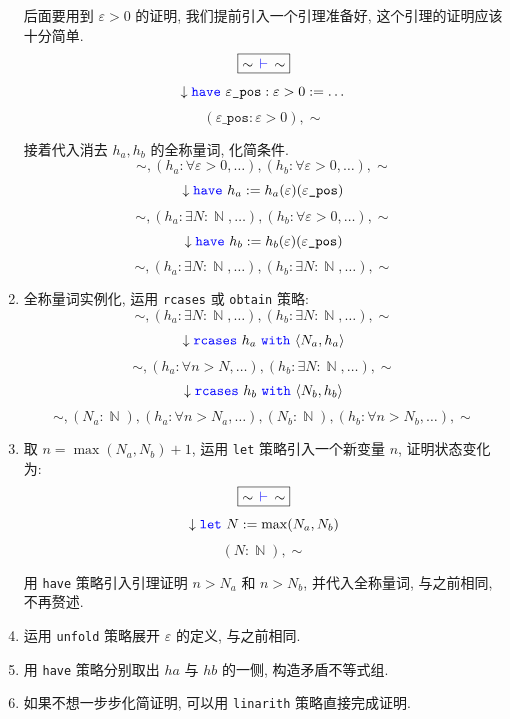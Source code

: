 \documentclass[UTF8]{ctexart}
\DeclareMathOperator{\N}{\mathbb{N}}                    %
\DeclareMathOperator{\0}{\mathbf{0}}                    %
\newcommand{\<}{\langle}
\renewcommand{\>}{\rangle}                              %
\theoremstyle{MyStyle} %
\newcommand*{\lean}[1]{\texttt{\color{blue}#1}}
\newcommand{\Goal}{\texttt{\,\color{leanblue}\ensuremath{\vdash}\,}}
\begin{document}
\begin{enumerate}
            后面要用到 $\varepsilon>0$ 的证明, 我们提前引入一个引理准备好, 这个引理的证明应该十分简单. 
            \[\boxed{\sim\Goal\sim}\]
            \[\downarrow\lean{have}\,\,\varepsilon\texttt{\_pos}:\varepsilon > 0:=\dots\]
            \[\boxed{(\varepsilon\texttt{\_pos}:\varepsilon>0),\sim}\]

            接着代入消去 $h_a,h_b$ 的全称量词, 化简条件. 
            \[\boxed{\sim,(h_a:\forall\varepsilon>0,\dots),(h_b:\forall\varepsilon>0,\dots),\sim}\]
            \[\downarrow\lean{have}\,\, h_a:=h_a(\varepsilon)(\varepsilon\texttt{\_pos})\]
            \[\boxed{\sim,(h_a:\exists N:\N,\dots),(h_b:\forall\varepsilon>0,\dots),\sim}\]
            \[\downarrow\lean{have}\,\, h_b:=h_b(\varepsilon)(\varepsilon\texttt{\_pos})\]
            \[\boxed{\sim,(h_a:\exists N:\N,\dots),(h_b:\exists N:\N,\dots),\sim}\]
            \item 全称量词实例化, 运用 \lean{rcases} 或 \lean{obtain} 策略: 
            \[\boxed{\sim,(h_a:\exists N:\N,\dots),(h_b:\exists N:\N,\dots),\sim}\]
            \[\downarrow\lean{rcases}\,\, h_a\,\,\lean{with}\,\,\langle N_a, h_a\rangle\]
            \[\boxed{\sim,(h_a:\forall n>N,\dots),(h_b:\exists N:\N,\dots),\sim}\]
            \[\downarrow\lean{rcases}\,\, h_b\,\,\lean{with}\,\,\langle N_b, h_b\rangle\]
            \[\boxed{\sim,(N_a : \N),(h_a:\forall n>N_a,\dots),(N_b : \N),(h_b:\forall n>N_b,\dots),\sim}\]
            \item 取 $n=\max(N_a,N_b)+1$, 运用 \lean{let} 策略引入一个新变量 $n$, 证明状态变化为: 
            \[\boxed{\sim\Goal\sim}\]
            \[\downarrow\lean{let}\,\,N:=\max(N_a,N_b)\]
            \[\boxed{(N:\N),\sim}\]
            
            用 \lean{have} 策略引入引理证明 $n>N_a$ 和 $n>N_b$, 并代入全称量词, 与之前相同, 不再赘述. 
            \item 运用 \lean{unfold} 策略展开 $\varepsilon$ 的定义, 与之前相同. 
            \item 用 \lean{have} 策略分别取出 $ha$ 与 $hb$ 的一侧, 构造矛盾不等式组. 
            \item 如果不想一步步化简证明, 可以用 \lean{linarith} 策略直接完成证明. 
        \end{enumerate}
\end{document}

